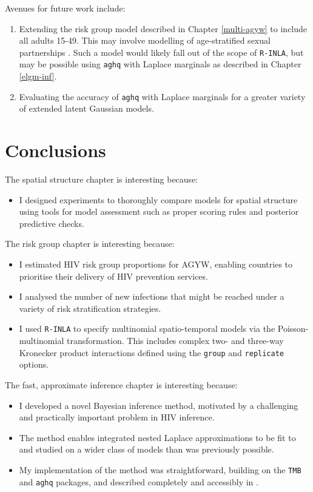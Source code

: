 \documentclass[a4paper, nobind]{templates/ociamthesis}
\providecommand{\tightlist}{%
  \setlength{\itemsep}{0pt}\setlength{\parskip}{0pt}}
\begin{document}
Avenues for future work include:

\begin{enumerate}
\def\labelenumi{\arabic{enumi}.}
\tightlist
\item
  Extending the risk group model described in Chapter \ref{multi-agyw} to include all adults 15-49. This may involve modelling of age-stratified sexual partnerships \autocite{wolock2021evaluating}. Such a model would likely fall out of the scope of \texttt{R-INLA}, but may be possible using \texttt{aghq} with Laplace marginals as described in Chapter \ref{elgm-inf}.
\item
  Evaluating the accuracy of \texttt{aghq} with Laplace marginals for a greater variety of extended latent Gaussian models.
\end{enumerate}

\hypertarget{conclusions-1}{%
\section{Conclusions}\label{conclusions-1}}

The spatial structure chapter is interesting because:

\begin{itemize}
\tightlist
\item
  I designed experiments to thoroughly compare models for spatial structure using tools for model assessment such as proper scoring rules and posterior predictive checks.
\end{itemize}

The risk group chapter is interesting because:

\begin{itemize}
\tightlist
\item
  I estimated HIV risk group proportions for AGYW, enabling countries to prioritise their delivery of HIV prevention services.
\item
  I analysed the number of new infections that might be reached under a variety of risk stratification strategies.
\item
  I used \texttt{R-INLA} to specify multinomial spatio-temporal models via the Poisson-multinomial transformation. This includes complex two- and three-way Kronecker product interactions defined using the \texttt{group} and \texttt{replicate} options.
\end{itemize}

The fast, approximate inference chapter is interesting because:

\begin{itemize}
\tightlist
\item
  I developed a novel Bayesian inference method, motivated by a challenging and practically important problem in HIV inference.
\item
  The method enables integrated nested Laplace approximations to be fit to and studied on a wider class of models than was previously possible.
\item
  My implementation of the method was straightforward, building on the \texttt{TMB} and \texttt{aghq} packages, and described completely and accessibly in \textcite{howes2023integrated}.
\end{itemize}
\end{document}
